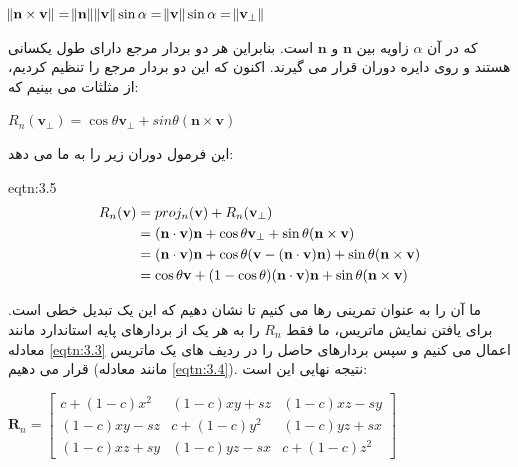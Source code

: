 {\begin{spacing}{1.5}
        \begin{center}
            $\norm{\textbf{n}\times\textbf{v}}=\norm{\textbf{n}}\norm{\textbf{v}}\sin\alpha=\norm{\textbf{v}}\sin\alpha=\norm{\textbf{v}_{\perp}}$
        \end{center}

        که در آن $\alpha$ زاویه بین $\textbf{n}$ و $\textbf{n}$ است.
        بنابراین هر دو بردار مرجع دارای طول یکسانی هستند و روی دایره دوران قرار می گیرند.
        اکنون که این دو بردار مرجع را تنظیم کردیم، از مثلثات می بینیم که:

        \begin{center}
            $R_{n}(\textbf{v}_{\perp})=\cos\theta\textbf{v}_{\perp}+sin\theta(\textbf{n}\times\textbf{v})$
        \end{center}

        این فرمول دوران زیر را به ما می دهد:

        \begin{eqtn}{eqtn:3.5}
            \centering
            \begin{equation*}
                \centering
                \begin{split}
                    R_{n}(\textbf{v})&=proj_{n}(\textbf{v})+R_{n}(\textbf{v}_{\perp})\\
                    &=(\textbf{n}\cdot\textbf{v})\textbf{n}+\cos\theta\textbf{v}_{\perp}+\sin\theta(\textbf{n}\times\textbf{v})\\
                    &=(\textbf{n}\cdot\textbf{v})\textbf{n}+\cos\theta(\textbf{v}-(\textbf{n}\cdot\textbf{v})\textbf{n})+\sin\theta(\textbf{n}\times\textbf{v})\\
                    &=\cos\theta\textbf{v}+(1-\cos\theta)(\textbf{n}\cdot\textbf{v})\textbf{n}+\sin\theta(\textbf{n}\times\textbf{v})
                \end{split}
            \end{equation*}
        \end{eqtn}

        ما آن را به عنوان تمرینی رها می کنیم تا نشان دهیم که این یک تبدیل خطی است.
        برای یافتن نمایش ماتریس، ما فقط $R_{n}$ را به هر یک از بردارهای پایه استاندارد مانند معادله \ref{eqtn:3.3} اعمال می کنیم و سپس بردارهای حاصل را در ردیف های یک ماتریس قرار می دهیم (مانند معادله \ref{eqtn:3.4}).
        نتیجه نهایی این است:

        \begin{center}
            $\textbf{R}_{n}=\begin{bmatrix}
                                c+(1-c)x^{2} & (1-c)xy+sz   & (1-c)xz-sy \\
                                (1-c)xy-sz   & c+(1-c)y^{2} & (1-c)yz+sx \\
                                (1-c)xz+sy   & (1-c)yz-sx   & c+(1-c)z^{2}
            \end{bmatrix}$
        \end{center}


\end{spacing}}
